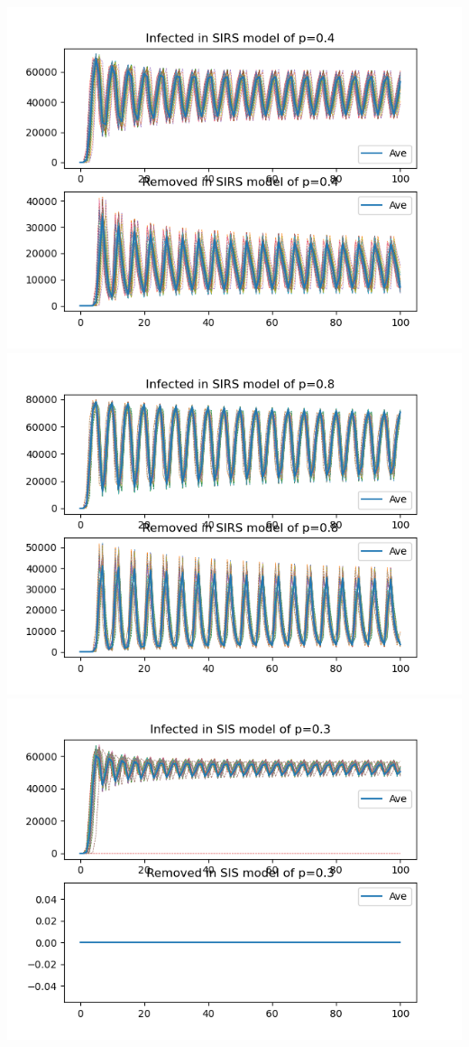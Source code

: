 \documentclass{subfile}
\begin{document}
  \begin{center}
    \includegraphics[scale=0.4]{sirsp04r1i3s3}
    \includegraphics[scale=0.4]{sirsp08r1i3s3}
    \includegraphics[scale=0.4]{sisp03r1i3s3}

\end{center}
\end{document}
